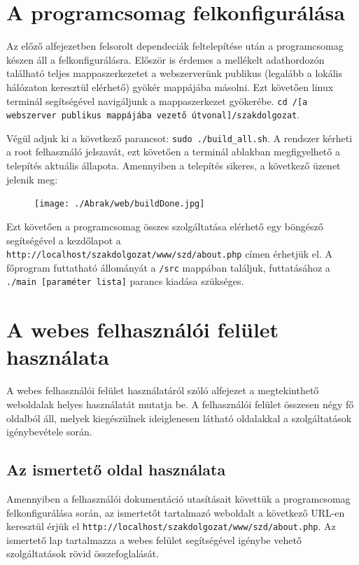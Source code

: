 \documentclass[oneside,titlepage,12pt,a4paper]{report}
\begin{document}
\section{A programcsomag felkonfigurálása}

Az előző alfejezetben felsorolt dependeciák feltelepítése után a programcsomag készen áll a felkonfigurálásra. Először is érdemes a mellékelt adathordozón található teljes mappaszerkezetet a webszerverünk publikus (legalább a lokális hálózaton keresztül elérhető) gyökér mappájába másolni. Ezt követően linux terminál segítségével navigáljunk a mappaszerkezet gyökerébe. \texttt{cd /[a webszerver publikus mappájába vezető útvonal]/szakdolgozat}. \par Végül adjuk ki a következő parancsot: \texttt{sudo ./build\_all.sh}. A rendszer kérheti a root felhasználó jelszavát, ezt követően a terminál ablakban megfigyelhető a telepítés aktuális állapota. Amennyiben a telepítés sikeres, a következő üzenet jelenik meg:

\begin{figure}[H]
\begin{center}
   \texttt{[image: ./Abrak/web/buildDone.jpg]}
\end{center}
\end{figure}

Ezt követően a programcsomag összes szolgáltatása elérhető egy böngésző segítségével a kezdőlapot a \texttt{http://localhost/szakdolgozat/www/szd/about.php} címen érhetjük el. A főprogram futtatható állományát a \texttt{/src} mappában találjuk, futtatásához a \texttt{./main [paraméter lista]} parancs kiadása szükséges. 

\section{A webes felhasználói felület használata}

A webes felhasználói felület használatáról szóló alfejezet a megtekinthető weboldalak helyes használatát mutatja be. A felhasználói felület összesen négy fő oldalból áll, melyek kiegészülnek ideiglenesen látható oldalakkal a szolgáltatások igénybevétele során. 

\subsection*{Az ismertető oldal használata}

Amennyiben a felhasználói dokumentáció utasításait követtük a programcsomag felkonfigurálása során, az ismertetőt tartalmazó weboldalt a következő URL-en keresztül érjük el \texttt{http://localhost/szakdolgozat/www/szd/about.php}. Az ismertető lap tartalmazza a webes felület segítségével igénybe vehető szolgáltatások rövid összefoglalását. 
\end{document}
